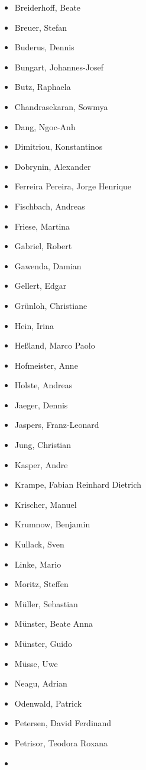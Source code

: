 \begin{itemize}
\tightlist
\item
  Breiderhoff, Beate
\item
  Breuer, Stefan
\item
  Buderus, Dennis
\item
  Bungart, Johannes-Josef
\item
  Butz, Raphaela
\item
  Chandrasekaran, Sowmya
\item
  Dang, Ngoc-Anh
\item
  Dimitriou, Konstantinos
\item
  Dobrynin, Alexander
\item
  Ferreira Pereira, Jorge Henrique
\item
  Fischbach, Andreas
\item
  Friese, Martina
\item
  Gabriel, Robert
\item
  Gawenda, Damian
\item
  Gellert, Edgar
\item
  Grünloh, Christiane
\item
  Hein, Irina
\item
  Heßland, Marco Paolo
\item
  Hofmeister, Anne
\item
  Holste, Andreas
\item
  Jaeger, Dennis
\item
  Jaspers, Franz-Leonard
\item
  Jung, Christian
\item
  Kasper, Andre
\item
  Krampe, Fabian Reinhard Dietrich
\item
  Krischer, Manuel
\item
  Krumnow, Benjamin
\item
  Kullack, Sven
\item
  Linke, Mario
\item
  Moritz, Steffen
\item
  Müller, Sebastian
\item
  Münster, Beate Anna
\item
  Münster, Guido
\item
  Müsse, Uwe
\item
  Neagu, Adrian
\item
  Odenwald, Patrick
\item
  Petersen, David Ferdinand
\item
  Petrisor, Teodora Roxana
\item

\end{itemize}
